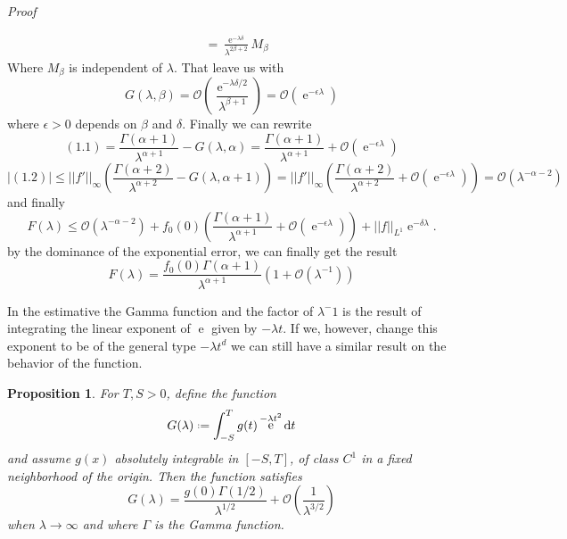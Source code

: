 \documentclass[]{report}
\makeatletter
\DeclareMathOperator{\ee}{e}
\newcommand{\Boh}{\mathcal{O}}
\newcommand*{\deff}{\mathrel{\vcenter{\baselineskip0.5ex \lineskiplimit0pt
			\hbox{\scriptsize.}\hbox{\scriptsize.}}}%
	=}
\newcommand{\dd}{\mathrm{d}}
\newtheorem{prop}[lemma]{Proposition}
\numberwithin{equation}{section} %
\newenvironment{Mproof}[1][Proof]{\par
	\pushQED{\qed}%
	\normalfont \topsep6\p@\@plus6\p@\relax
	\trivlist
	\item\relax
	{\itshape
		#1\@addpunct{.}}\hspace\labelsep\ignorespaces
}{%
	\popQED\endtrivlist\@endpefalse
}
\makeatother
\begin{document}
\begin{Mproof}
\begin{equation*}
\begin{split}
		& = \frac{\ee^{-\lambda \delta}}{\lambda^{2\beta + 2}} M_\beta
		\end{split}
	\end{equation*}
	Where $M_\beta$ is independent of $\lambda$. That leave us with
	$$G(\lambda, \beta) = \Boh\left(\frac{\ee^{-\lambda\delta/2}}{\lambda^{\beta+1}}\right) = \Boh\left(\ee^{-\epsilon\lambda}\right)$$
	where $\epsilon > 0$ depends on $\beta$ and $\delta$. Finally we can rewrite
	$$(1.1) = \frac{\Gamma(\alpha + 1)}{\lambda^{\alpha +1}} - G(\lambda, \alpha) =  \frac{\Gamma(\alpha + 1)}{\lambda^{\alpha+1}} + \Boh\left(\ee^{-\epsilon\lambda}\right)$$
	$$|(1.2)| \leq ||f'||_{\infty} \left( \frac{\Gamma(\alpha + 2)}{\lambda^{\alpha +2}} - G(\lambda, \alpha + 1) \right) = ||f'||_{\infty} \left( \frac{\Gamma(\alpha + 2)}{\lambda^{\alpha +2}} + \Boh\left(\ee^{-\epsilon\lambda}\right) \right) = \Boh\left(\lambda^{-\alpha-2}\right)$$
	and finally
	$$F(\lambda) \leq \Boh\left(\lambda^{-\alpha-2}\right) + f_0(0) \left( \frac{\Gamma(\alpha + 1)}{\lambda^{\alpha+1}} + \Boh\left(\ee^{-\epsilon\lambda}\right) \right) + ||f||_{L^1} \ee^{-\delta \lambda}.$$
	by the dominance of the exponential error, we can finally get the result
	$$F(\lambda) = \frac{f_0(0) \Gamma(\alpha + 1)}{\lambda^{\alpha + 1}} (1 + \Boh(\lambda^{-1}))$$
\end{Mproof}

In the estimative the Gamma function and the factor of $\lambda^-1$ is the result of integrating the linear exponent of $\ee$ given by $-\lambda t$. If we, however, change this exponent to be of the general type $-\lambda t^d$ we can still have a similar result on the behavior of the function.

\begin{prop}	
	For $T, S > 0$, define the function
	$$G(\lambda) \deff \int_{-S}^{T} g(t) \ee^{-\lambda t^2} \dd t$$
	and assume $g(x)$ absolutely integrable in $[-S, T]$, of class $C^1$ in a fixed neighborhood of the origin. Then the function satisfies
	\begin{equation}
		G(\lambda) = \frac{g(0) \Gamma(1/2)}{\lambda^{1/2}} + \Boh \left(\frac{1}{\lambda^{3/2}} \right)
	\end{equation}
	when $\lambda \rightarrow \infty$ and where $\Gamma$ is the Gamma function.
	\label{prop: cor watson}
\end{prop}
\end{document}
